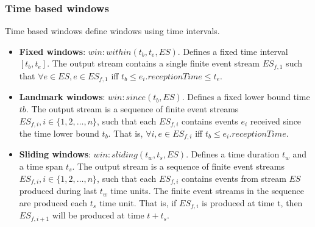  \subsubsection{Time based windows}
Time based windows define windows using time intervals. 
\begin{itemize} 
\item \textbf{Fixed windows}: $win:within(t_b, t_e, ES)$. Defines a fixed time interval $[t_b, t_e]$. The output stream contains a single finite event stream $ES_{f,1}$ such that $\forall e \in ES, e \in ES_{f,1}$ iff $t_b \leq e_i.receptionTime \leq t_e $. 
\item \textbf{Landmark windows}: $win:since(t_b, ES)$. Defines a fixed lower bound time $tb$. The output stream is a sequence of finite event streams $ES_{f,i}, i \in \{1, 2, …, n\}$, such that each $ES_{f,i}$ contains events $e_i$ received since the time lower bound $t_b$. That is, $\forall i, e \in ES_{f,i}$ iff $t_b \leq e_i.receptionTime$.
\item \textbf{Sliding windows}: $win:sliding(t_w, t_s, ES)$. Defines a time duration $t_w$ and a time span $t_s$. The output stream
is a sequence of finite event streams  $ES_{f,i}, i \in \{1, 2, …, n\}$, such that each $ES_{f,i}$ contains events from stream $ES$ produced 
during last $t_w$ time units. The finite event streams in the sequence are produced each $t_s$ time unit. That is, if $ES_{f,i}$ is produced at time t, then $ES_{f,i+1}$ will be produced at time $t+t_s$. 
\end{itemize}
